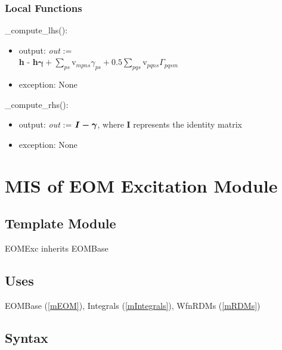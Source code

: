 \documentclass[12pt, titlepage]{article}
\begin{document}
\subsubsection{Local Functions}

\noindent \_compute\_lhs():
\begin{itemize}
	\item output: \textit{out} :=\\
	\textbf{h} - \textbf{h}$\boldsymbol{\gamma}
	+\sum_{ps}$v$_{mpns} \gamma_{ps} 
	+ 0.5\sum_{pqs}$v$_{pqns}\Gamma_{pqsm}$
	\item exception: None 
\end{itemize}

\noindent\_compute\_rhs():
\begin{itemize}
	\item output: \textit{out} := $\boldmath{I} - \boldsymbol{\gamma}$, where 
	\textbf{I} represents the identity matrix
	\item exception: None 
\end{itemize}

\newpage

\section{MIS of EOM Excitation Module} \label{mEOMExc}

\subsection{Template Module}

EOMExc inherits EOMBase

\subsection{Uses}
EOMBase (\ref{mEOM}), Integrals (\ref{mIntegrals}), WfnRDMs (\ref{mRDMs})

\subsection{Syntax}
\end{document}
